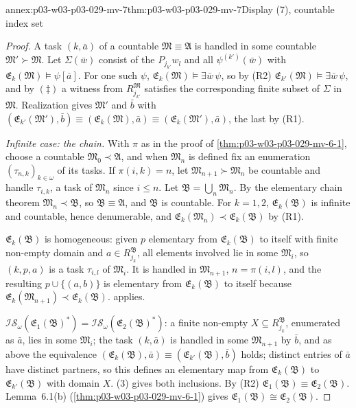 \begin{annexitem}{annex:p03-w03-p03-029-mv-7}{thm:p03-w03-p03-029-mv-7}{Display (7), countable index set}
\begin{proof}
A task \((k,\bar a)\) of a countable \(\mathfrak M\equiv\mathfrak A\) is
handled in some countable \(\mathfrak M'\succ\mathfrak M\). Let
\(\Sigma(\bar w)\) consist of the \(P_{j_{k'}}w_l\) and all
\(\psi^{(k')}(\bar w)\) with \(\mathfrak E_k(\mathfrak
M)\models\psi[\bar a]\). For one such \(\psi\),
\(\mathfrak E_k(\mathfrak M)\models\exists\bar w\,\psi\), so by (R2)
\(\mathfrak E_{k'}(\mathfrak M)\models\exists\bar w\,\psi\), and by
\((\ddagger)\) a witness from \(R_{j_{k'}}^{\mathfrak M}\) satisfies the
corresponding finite subset of \(\Sigma\) in \(\mathfrak M\). Realization
gives \(\mathfrak M'\) and \(\bar b\) with \((\mathfrak E_{k'}(\mathfrak
M'),\bar b)\equiv(\mathfrak E_k(\mathfrak M),\bar a)\equiv(\mathfrak
E_k(\mathfrak M'),\bar a)\), the last by (R1).

\emph{Infinite case: the chain.} With \(\pi\) as in the proof of
\cref{thm:p03-w03-p03-029-mv-6-1}, choose a countable \(\mathfrak
M_0\prec\mathfrak A\), and when \(\mathfrak M_n\) is defined fix an
enumeration \((\tau_{n,k})_{k\in\omega}\) of its tasks. If \(\pi(i,k)=n\), let
\(\mathfrak M_{n+1}\succ\mathfrak M_n\) be countable and handle
\(\tau_{i,k}\), a task of \(\mathfrak M_n\) since \(i\leq n\). Let
\(\mathfrak B=\bigcup_n\mathfrak M_n\). By the elementary chain theorem
\(\mathfrak M_n\prec\mathfrak B\), so \(\mathfrak B\equiv\mathfrak A\), and
\(\mathfrak B\) is countable. For \(k=1,2\), \(\mathfrak E_k(\mathfrak B)\)
is infinite and countable, hence denumerable, and \(\mathfrak
E_k(\mathfrak M_n)\prec\mathfrak E_k(\mathfrak B)\) by (R1).

\(\mathfrak E_k(\mathfrak B)\) is homogeneous: given \(p\) elementary from
\(\mathfrak E_k(\mathfrak B)\) to itself with finite non-empty domain and
\(a\in R_{j_k}^{\mathfrak B}\), all elements involved lie in some
\(\mathfrak M_i\), so \((k,p,a)\) is a task \(\tau_{i,l}\) of \(\mathfrak
M_i\). It is handled in \(\mathfrak M_{n+1}\), \(n=\pi(i,l)\), and the
resulting \(p\cup\{(a,b)\}\) is elementary from \(\mathfrak
E_k(\mathfrak B)\) to itself because \(\mathfrak E_k(\mathfrak
M_{n+1})\prec\mathfrak E_k(\mathfrak B)\).
 applies.

\(\mathscr I\mathscr S_\omega(\mathfrak E_1(\mathfrak B)^*)=\mathscr I\mathscr
S_\omega(\mathfrak E_2(\mathfrak B)^*)\): a finite non-empty
\(X\subseteq R_{j_k}^{\mathfrak B}\), enumerated as \(\bar a\), lies in
some \(\mathfrak M_i\); the task \((k,\bar a)\) is handled in some
\(\mathfrak M_{n+1}\) by \(\bar b\), and as above the equivalence
\((\mathfrak E_k(\mathfrak B),\bar a)\equiv(\mathfrak E_{k'}(\mathfrak
B),\bar b)\) holds; distinct entries of \(\bar a\) have distinct partners, so
this defines an elementary map from \(\mathfrak E_k(\mathfrak B)\) to
\(\mathfrak E_{k'}(\mathfrak B)\) with domain \(X\).
(3) gives both inclusions. By (R2)
\(\mathfrak E_1(\mathfrak B)\equiv\mathfrak E_2(\mathfrak B)\). Lemma~6.1(b)
(\cref{thm:p03-w03-p03-029-mv-6-1}) gives \(\mathfrak E_1(\mathfrak
B)\cong\mathfrak E_2(\mathfrak B)\).
\end{proof}
\end{annexitem}

